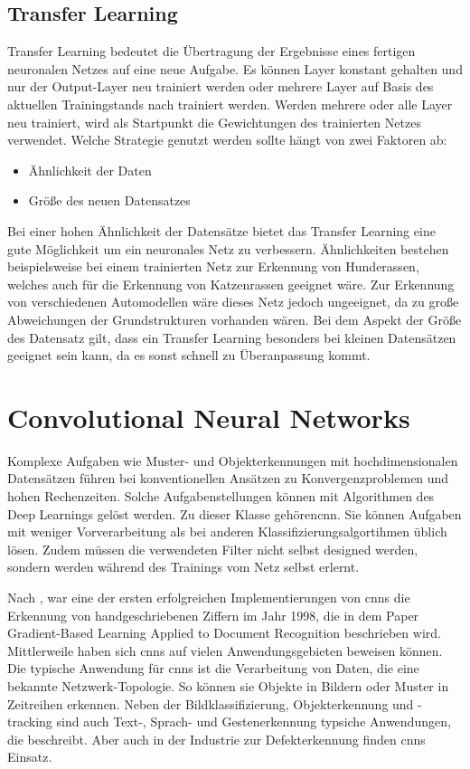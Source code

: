 \subsection{Transfer Learning}
	Transfer Learning bedeutet die Übertragung der Ergebnisse eines fertigen neuronalen Netzes auf eine neue Aufgabe. 
	Es können Layer konstant gehalten und nur der Output-Layer
	neu trainiert werden oder mehrere Layer auf Basis des aktuellen Trainingstands nach
	trainiert werden. Werden mehrere oder alle Layer neu trainiert, wird als Startpunkt die
	Gewichtungen des trainierten Netzes verwendet. Welche Strategie genutzt werden sollte
	hängt von zwei Faktoren ab:
	
	\begin{itemize}
		\item Ähnlichkeit der Daten
		\item Größe des neuen Datensatzes
	\end{itemize}
		
	Bei einer hohen Ähnlichkeit der Datensätze bietet das Transfer Learning eine gute Möglichkeit
	um ein neuronales Netz zu verbessern. Ähnlichkeiten bestehen beispielsweise bei einem
	trainierten Netz zur Erkennung von Hunderassen, welches auch für die Erkennung von
	Katzenrassen geeignet wäre. Zur Erkennung von verschiedenen Automodellen wäre dieses Netz jedoch ungeeignet, 
	da zu große Abweichungen der Grundstrukturen vorhanden	wären.
	Bei dem Aspekt der Größe des Datensatz gilt, dass ein Transfer Learning besonders bei
	kleinen Datensätzen geeignet sein kann, da es sonst schnell zu Überanpassung kommt. \cite{Becker:2018}
	
	
\section{Convolutional Neural Networks}

Komplexe Aufgaben wie Muster- und Objekterkennungen mit hochdimensionalen Datensätzen führen bei konventionellen 
Ansätzen zu Konvergenzproblemen und hohen Rechenzeiten. Solche Aufgabenstellungen können mit Algorithmen des 
Deep Learnings gelöst werden. Zu dieser Klasse gehören\ac{cnn}. \cite{Ertel:2016}
Sie können Aufgaben mit weniger Vorverarbeitung als bei anderen Klassifizierungsalgortihmen üblich lösen. 
Zudem müssen die verwendeten Filter nicht selbst designed werden, sondern werden während des Trainings vom Netz 
selbst erlernt. \cite{Saha:2018}

Nach \cite{Sharma:2018}, war eine der ersten erfolgreichen Implementierungen von \ac{cnn}s die Erkennung von 
handgeschriebenen Ziffern im Jahr 1998, die in dem Paper \glqq Gradient-Based Learning Applied to Document Recognition\grqq \cite{LeCun:1998} 
beschrieben wird. Mittlerweile haben sich \ac{cnn}s auf vielen Anwendungsgebieten beweisen können. Die typische Anwendung für \ac{cnn}s ist die Verarbeitung von Daten, die eine bekannte Netzwerk-Topologie. So können sie Objekte in Bildern oder Muster in 
Zeitreihen erkennen. \cite{Namatevs:2017}
Neben der Bildklassifizierung, Objekterkennung und -tracking sind auch Text-, Sprach- und Gestenerkennung typsiche Anwendungen, 
die \cite{Gu:2018} beschreibt. Aber auch in der Industrie zur Defekterkennung finden \ac{cnn}s Einsatz. \cite{LopezdeLacalle:2020}

